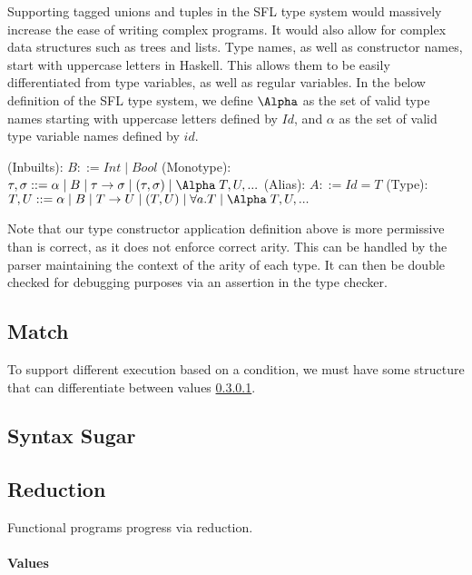 Supporting tagged unions and tuples in the SFL type system would massively increase the ease of writing complex programs. It would also allow for complex data structures such as trees and lists. 
Type names, as well as constructor names, start with uppercase letters in Haskell. This allows them to be easily differentiated from type variables, as well as regular variables. 
In the below definition of the SFL type system, we define \(\Alpha\) as the set of valid type names starting with uppercase letters defined by \(Id\), and \(\alpha\) as the set of valid type variable names defined by \(id\). 

\begin{syntax}
(Inbuilts): \(B::=Int\mid Bool\)\newline
(Monotype): \(\tau, \sigma ::= \alpha \mid B \mid \tau \rightarrow \sigma \mid (\tau, \sigma) \mid \Alpha \;T, U,...\)\newline
(Alias): \(A ::= Id = T\)\newline
(Type): \(T, U ::= \alpha \mid B \mid T \rightarrow U \mid (T, U) \mid \forall a. T \mid \Alpha \;T, U,...\)
\end{syntax}
Note that our type constructor application definition above is more permissive than is correct, as it does not enforce correct arity. This can be handled by the parser maintaining the context of the arity of each type. It can then be double checked for debugging purposes via an assertion in the type checker. 

\subsection{Match}
To support different execution based on a condition, we must have some structure that can differentiate between values \ref{design:values}. 

\subsection{Syntax Sugar}

\subsection{Reduction}
Functional programs progress via reduction. 
\paragraph{Values}
\label{design:values}